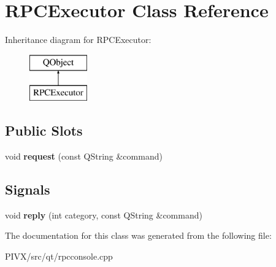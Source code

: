 \hypertarget{class_r_p_c_executor}{}\section{R\+P\+C\+Executor Class Reference}
\label{class_r_p_c_executor}
Inheritance diagram for R\+P\+C\+Executor\+:\begin{figure}[H]
\begin{center}
\leavevmode
\includegraphics[height=2.000000cm]{class_r_p_c_executor}
\end{center}
\end{figure}
\subsection*{Public Slots}
\begin{DoxyCompactItemize}
\item 
\mbox{\label{class_r_p_c_executor_a26e314b5c74eef7a5d310578e1cdb1eb}} 
void {\bfseries request} (const Q\+String \&command)
\end{DoxyCompactItemize}
\subsection*{Signals}
\begin{DoxyCompactItemize}
\item 
\mbox{\label{class_r_p_c_executor_a1ecf85a67c8bb88cc0742b36156a3bae}} 
void {\bfseries reply} (int category, const Q\+String \&command)
\end{DoxyCompactItemize}


The documentation for this class was generated from the following file\+:\begin{DoxyCompactItemize}
\item 
P\+I\+V\+X/src/qt/rpcconsole.\+cpp\end{DoxyCompactItemize}
